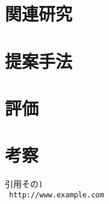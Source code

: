 \documentclass[a4j,10pt]{jarticle}
\begin{document}
\section{関連研究}

\section{提案手法}

\section{評価}

\section{考察}

\begin{thebibliography}{99}
引用その1\\
\texttt{ http://www.example.com}
\end{thebibliography}
\end{document}
